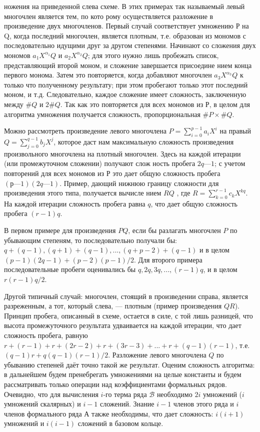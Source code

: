 \noindent
ножения на приведенной сле­ва схеме. В этих примерах так называемый левый много­член является тем, по кото­
рому осуществляется разложе­ние в произведение двух мно­гочленов. Первый случай со­ответствует умножению Р на Q, когда последний многочлен, является плотным, т.е. образо­ван из мономов с последова­тельно идущими друг за другом степенями. Начинают со сложения двух
мономов $a_{1}X^{\alpha _1}Q$ и $a_{2}X^{\alpha _2}Q$; для этого нужно лишь пробежать список,
представляющий второй моном, и сложение завершается присоедине­
нием конца первого монома. Затем это повторяется, когда добавляют
многочлен $a_{3}X^{\alpha _3}Q$  к только что полученному результату; при этом пробегают только этот последний моном, и т.д. Следовательно, каждое
сложение имеет сложность, заключенную между $\#Q$ и $2\#Q$. Так как это
повторяется для всех мономов из $Р$, в целом для алгоритма умножения
получается сложность, пропорциональная $\#P \times \#Q$.
\par Можно рассмотреть произведение левого многочлена $ P =\sum^{p-1}_{i=0}a_{i}X^i$ на правый $Q =\sum^{q-1}_{j=0}b_{j}X^{j} $, которое даст нам максимальную сложность
произведения произвольного многочлена на плотный многочлен. Здесь
на каждой итерации (или промежуточном сложении) получают слож­
ность пробега $2q — 1$; с учетом повторений для всех мономов из $Р$ это дает общую сложность пробега $(р— 1)(2q — 1)$. Пример, дающий нижнюю
границу сложности для произведения этого типа, получается вычисле­
нием $RQ$ , где $R =\sum^{r-1}_{k=0}c_{k}X^{kq}$. На каждой итерации сложность пробега
равна $q$, что дает общую сложность пробега $(r - 1)q$.
\par В первом примере для произведения $PQ$, если бы разлагать мно­гочлен $P$ по убывающим степеням, то последовательно получали бы:$q + (q - 1), (q + 1) + (q - 1), ..., (q + p - 2) + (q - 1)$ и в целом $(p - 1)(2q - 1) + (p - 2)(p - 1)/2 $. Для второго примера последовательные пробеги
оценивались бы $q, 2q, 3q, ..., (r - 1)q$, и в целом $r(r - 1)q/2$.
\par Другой типичный случай: многочлен, стоящий в произведении спра­ва, является разреженным, а тот, который слева, — плотным (пример
произведения $QR$). Принцип пробега, описанный в схеме, остается в
силе, с той лишь разницей, что высота промежуточного результата
удваивается на каждой итерации, что дает сложность пробега, равную
$r + (r - 1) + r + (2r - 2) + r + (3r - 3) + ... + r + (q - 1)(r - 1)$, т.е. $(q - 1)r + q(q - 1)(r - 1)/2$. Разложение левого многочлена $Q$ по убыванию степеней даёт точно такой же результат.
\newline
\noindent Оценим сложность алгоритма: в дальнейшем будем пренебрегать умно­жениями на целые константы и будем рассматривать только операции
над коэффициентами формальных рядов. Очевидно, что для вычисле­ния $i$-го терма ряда $\mathcal{B}$ необходимо $2i$ умножений ($i$ умножений скалярных) и $i-1$ сложений. Знание $i-1$ членов этого ряда и $i$ членов
формального ряда А также необходимы, что дает сложность: $i(i+1)$
умножений и $i(i-1)$ сложений в базовом кольце.

